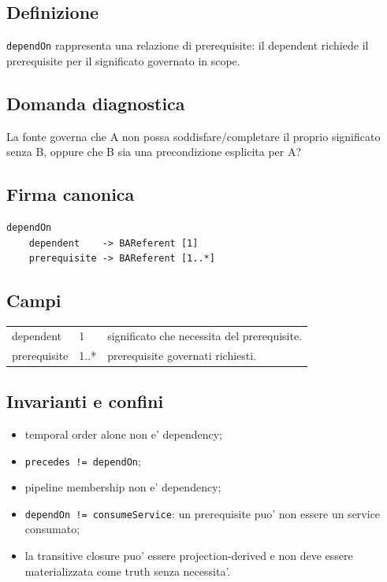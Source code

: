 \documentclass[11pt,a4paper]{article}
\begin{document}
\subsection{Definizione}
\texttt{dependOn} rappresenta una relazione di prerequisite: il dependent richiede il prerequisite per il significato governato in scope.

\subsection{Domanda diagnostica}
La fonte governa che A non possa soddisfare/completare il proprio significato senza B, oppure che B sia una precondizione esplicita per A?

\subsection{Firma canonica}
\begin{lstlisting}
dependOn
    dependent    -> BAReferent [1]
    prerequisite -> BAReferent [1..*]
\end{lstlisting}

\subsection{Campi}
\begin{tabularx}{\textwidth}{L{36mm}L{24mm}Y}
\toprule
dependent & 1 & significato che necessita del prerequisite. \\
prerequisite & 1..* & prerequisite governati richiesti. \\
\bottomrule
\end{tabularx}

\subsection{Invarianti e confini}
\begin{itemize}
  \item temporal order alone non e' dependency;
  \item \texttt{precedes != dependOn};
  \item pipeline membership non e' dependency;
  \item \texttt{dependOn != consumeService}: un prerequisite puo' non essere un service consumato;
  \item la transitive closure puo' essere projection-derived e non deve essere materializzata come truth senza necessita'.
\end{itemize}
\end{document}

